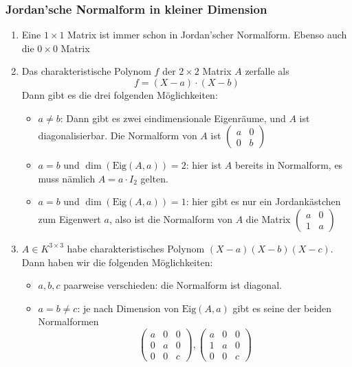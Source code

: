 \documentclass{kit}
\begin{document}
    \subsubsection{Jordan'sche Normalform in kleiner Dimension}
      \begin{enumerate}
        \item Eine $1\times 1$ Matrix ist immer schon in Jordan'scher Normalform. Ebenso auch die $0\times 0$ Matrix
        \item Das charakteristische Polynom $f$ der $2\times 2$ Matrix $A$ zerfalle als 
          $$f=(X-a)\cdot(X-b)$$
          Dann gibt es die drei folgenden Möglichkeiten:
          \begin{itemize}
            \item $a\neq b$: Dann gibt es zwei eindimensionale Eigenräume, und $A$ ist diagonalisierbar. Die Normalform
              von $A$ ist $\begin{pmatrix} a & 0 \\ 0 & b \end{pmatrix}$
            \item $a=b$ und $\dim(\text{Eig}(A,a))=2$: hier ist $A$ bereits in Normalform, es muss nämlich $A=a\cdot I_2$
              gelten.
            \item $a=b$ und $\dim(\text{Eig}(A,a))=1$: hier gibt es nur ein Jordankästchen zum Eigenwert $a$, also ist die
              Normalform von $A$ die Matrix $\begin{pmatrix} a & 0 \\ 1 & a \end{pmatrix}$
          \end{itemize}
        \item $A\in K^{3\times 3}$ habe charakteristisches Polynom $(X-a)(X-b)(X-c)$. Dann haben wir die folgenden
          Möglichkeiten:
          \begin{itemize}
            \item $a,b,c$ paarweise verschieden: die Normalform ist diagonal.
            \item $a=b\neq c$: je nach Dimension von $\text{Eig}(A,a)$ gibt es seine der beiden Normalformen
              $$\begin{pmatrix} a & 0 & 0 \\ 0 & a & 0 \\ 0 & 0 & c \end{pmatrix},
              \begin{pmatrix} a & 0 & 0 \\ 1 & a & 0 \\ 0 & 0 & c \end{pmatrix}$$

\end{itemize}
\end{enumerate}
\end{document}
